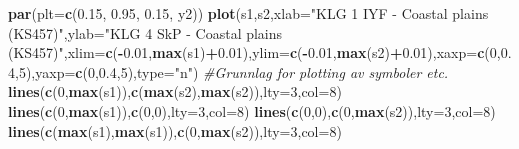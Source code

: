 \documentclass[]{article}
\newenvironment{Shaded}{\begin{snugshade}}{\end{snugshade}}
\newcommand{\CommentTok}[1]{\textcolor[rgb]{0.56,0.35,0.01}{\textit{#1}}}
\newcommand{\DataTypeTok}[1]{\textcolor[rgb]{0.13,0.29,0.53}{#1}}
\newcommand{\DecValTok}[1]{\textcolor[rgb]{0.00,0.00,0.81}{#1}}
\newcommand{\FloatTok}[1]{\textcolor[rgb]{0.00,0.00,0.81}{#1}}
\newcommand{\KeywordTok}[1]{\textcolor[rgb]{0.13,0.29,0.53}{\textbf{#1}}}
\newcommand{\NormalTok}[1]{#1}
\newcommand{\OperatorTok}[1]{\textcolor[rgb]{0.81,0.36,0.00}{\textbf{#1}}}
\newcommand{\StringTok}[1]{\textcolor[rgb]{0.31,0.60,0.02}{#1}}
\begin{document}
\begin{Shaded}
\begin{Highlighting}[]
\KeywordTok{par}\NormalTok{(}\DataTypeTok{plt=}\KeywordTok{c}\NormalTok{(}\FloatTok{0.15}\NormalTok{, }\FloatTok{0.95}\NormalTok{, }\FloatTok{0.15}\NormalTok{, y2))}
\KeywordTok{plot}\NormalTok{(s1,s2,}\DataTypeTok{xlab=}\StringTok{"KLG 1 IYF - Coastal plains (KS457)"}\NormalTok{,}\DataTypeTok{ylab=}\StringTok{"KLG 4 SkP - Coastal plains (KS457)"}\NormalTok{,}\DataTypeTok{xlim=}\KeywordTok{c}\NormalTok{(}\OperatorTok{-}\FloatTok{0.01}\NormalTok{,}\KeywordTok{max}\NormalTok{(s1)}\OperatorTok{+}\FloatTok{0.01}\NormalTok{),}\DataTypeTok{ylim=}\KeywordTok{c}\NormalTok{(}\OperatorTok{-}\FloatTok{0.01}\NormalTok{,}\KeywordTok{max}\NormalTok{(s2)}\OperatorTok{+}\FloatTok{0.01}\NormalTok{),}\DataTypeTok{xaxp=}\KeywordTok{c}\NormalTok{(}\DecValTok{0}\NormalTok{,}\FloatTok{0.4}\NormalTok{,}\DecValTok{5}\NormalTok{),}\DataTypeTok{yaxp=}\KeywordTok{c}\NormalTok{(}\DecValTok{0}\NormalTok{,}\FloatTok{0.4}\NormalTok{,}\DecValTok{5}\NormalTok{),}\DataTypeTok{type=}\StringTok{"n"}\NormalTok{) }\CommentTok{#Grunnlag for plotting av symboler etc.}
\KeywordTok{lines}\NormalTok{(}\KeywordTok{c}\NormalTok{(}\DecValTok{0}\NormalTok{,}\KeywordTok{max}\NormalTok{(s1)),}\KeywordTok{c}\NormalTok{(}\KeywordTok{max}\NormalTok{(s2),}\KeywordTok{max}\NormalTok{(s2)),}\DataTypeTok{lty=}\DecValTok{3}\NormalTok{,}\DataTypeTok{col=}\DecValTok{8}\NormalTok{)}
\KeywordTok{lines}\NormalTok{(}\KeywordTok{c}\NormalTok{(}\DecValTok{0}\NormalTok{,}\KeywordTok{max}\NormalTok{(s1)),}\KeywordTok{c}\NormalTok{(}\DecValTok{0}\NormalTok{,}\DecValTok{0}\NormalTok{),}\DataTypeTok{lty=}\DecValTok{3}\NormalTok{,}\DataTypeTok{col=}\DecValTok{8}\NormalTok{)}
\KeywordTok{lines}\NormalTok{(}\KeywordTok{c}\NormalTok{(}\DecValTok{0}\NormalTok{,}\DecValTok{0}\NormalTok{),}\KeywordTok{c}\NormalTok{(}\DecValTok{0}\NormalTok{,}\KeywordTok{max}\NormalTok{(s2)),}\DataTypeTok{lty=}\DecValTok{3}\NormalTok{,}\DataTypeTok{col=}\DecValTok{8}\NormalTok{)}
\KeywordTok{lines}\NormalTok{(}\KeywordTok{c}\NormalTok{(}\KeywordTok{max}\NormalTok{(s1),}\KeywordTok{max}\NormalTok{(s1)),}\KeywordTok{c}\NormalTok{(}\DecValTok{0}\NormalTok{,}\KeywordTok{max}\NormalTok{(s2)),}\DataTypeTok{lty=}\DecValTok{3}\NormalTok{,}\DataTypeTok{col=}\DecValTok{8}\NormalTok{)}


\end{Highlighting}
\end{Shaded}
\end{document}
